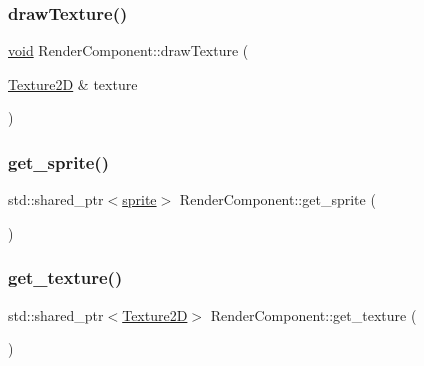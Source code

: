 \mbox{\label{classRenderComponent_a3d25a4dc34ed86b6165b985abe8e762b}} 
\subsubsection{\texorpdfstring{draw\+Texture()}{drawTexture()}}
{\footnotesize\ttfamily \hyperlink{imgui__impl__opengl3__loader_8h_ac668e7cffd9e2e9cfee428b9b2f34fa7}{void} Render\+Component\+::draw\+Texture (\begin{DoxyParamCaption}\item[{\hyperlink{classTexture2D}{Texture2D} \&}]{texture }\end{DoxyParamCaption})}

\mbox{\label{classRenderComponent_a43c12db168ff23056f06b62a88d9cfa4}} 
\subsubsection{\texorpdfstring{get\+\_\+sprite()}{get\_sprite()}}
{\footnotesize\ttfamily std\+::shared\+\_\+ptr$<$\hyperlink{classsprite}{sprite}$>$ Render\+Component\+::get\+\_\+sprite (\begin{DoxyParamCaption}{ }\end{DoxyParamCaption})\hspace{0.3cm}{\ttfamily [inline]}}

\mbox{\label{classRenderComponent_ad505bc06bf0bcab5f714496b21a331d1}} 
\subsubsection{\texorpdfstring{get\+\_\+texture()}{get\_texture()}}
{\footnotesize\ttfamily std\+::shared\+\_\+ptr$<$\hyperlink{classTexture2D}{Texture2D}$>$ Render\+Component\+::get\+\_\+texture (\begin{DoxyParamCaption}{ }\end{DoxyParamCaption})\hspace{0.3cm}{\ttfamily [inline]}}

